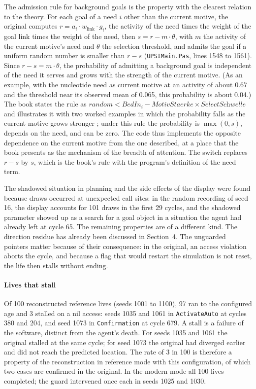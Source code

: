 \documentclass[preprint,12pt,authoryear]{elsarticle}
\newcommand{\code}[1]{\texttt{#1}}
\begin{document}
The admission rule for background goals is the property with the clearest relation to the theory. For each goal of a need $i$ other than the current motive, the original computes $r = a_i \cdot w_{\text{link}} \cdot g_i$, the activity of the need times the weight of the goal link times the weight of the need, then $s = r - m \cdot \theta$, with $m$ the activity of the current motive's need and $\theta$ the selection threshold, and admits the goal if a uniform random number is smaller than $r - s$ (\code{UPSIMain.Pas}, lines 1548 to 1561). Since $r - s = m \cdot \theta$, the probability of admitting a background goal is independent of the need it serves and grows with the strength of the current motive. (As an example, with the nucleotide need as current motive at an activity of about 0.67 and the threshold near its observed mean of 0.065, this probability is about 0.04.) The book states the rule as $\textit{random} < \textit{BedIn}_i - \textit{MotivStaerke} \times \textit{SelectSchwelle}$ and illustrates it with two worked examples in which the probability falls as the current motive grows stronger \citep[p.~99]{doerner2002mechanik}; under this rule the probability is $\max(0, s)$, depends on the need, and can be zero. The code thus implements the opposite dependence on the current motive from the one described, at a place that the book presents as the mechanism of the breadth of attention. The switch replaces $r - s$ by $s$, which is the book's rule with the program's definition of the need term.

The shadowed situation in planning and the side effects of the display were found because draws occurred at unexpected call sites: in the random recording of seed 16, the display accounts for 101 draws in the first 29 cycles, and the shadowed parameter showed up as a search for a goal object in a situation the agent had already left at cycle 65. The remaining properties are of a different kind. The direction residue has already been discussed in Section~4. The unguarded pointers matter because of their consequence: in the original, an access violation aborts the cycle, and because a flag that would restart the simulation is not reset, the life then stalls without ending.

\paragraph{Lives that stall} Of 100 reconstructed reference lives (seeds 1001 to 1100), 97 ran to the configured age and 3 stalled on a nil access: seeds 1035 and 1061 in \code{ActivateAuto} at cycles 380 and 204, and seed 1073 in \code{Confirmation} at cycle 679. A stall is a failure of the software, distinct from the agent's death. For seeds 1035 and 1061 the original stalled at the same cycle; for seed 1073 the original had diverged earlier and did not reach the predicted location. The rate of 3 in 100 is therefore a property of the reconstruction in reference mode with this configuration, of which two cases are confirmed in the original. In the modern mode all 100 lives completed; the guard intervened once each in seeds 1025 and 1030.
\end{document}
